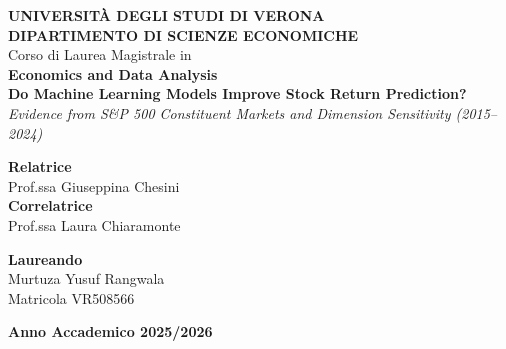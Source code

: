 \documentclass[12pt, a4paper]{report}
\begin{document}
\begin{titlepage}
\centering
\vspace*{0.5cm}

{\fontsize{14}{18}\selectfont\textbf{UNIVERSITÀ DEGLI STUDI DI VERONA}}\\[0.3cm]
{\fontsize{13}{16}\selectfont\textbf{DIPARTIMENTO DI SCIENZE ECONOMICHE}}\\[1.8cm]

{\fontsize{12}{15}\selectfont Corso di Laurea Magistrale in}\\[0.2cm]
{\fontsize{13}{16}\selectfont\textbf{Economics and Data Analysis}}\\[2.5cm]

{\fontsize{16}{20}\selectfont\textbf{Do Machine Learning Models Improve Stock Return Prediction?}}\\[0.4cm]
{\fontsize{12}{15}\selectfont\textit{Evidence from S\&P 500 Constituent Markets and Dimension Sensitivity (2015--2024)}}\\[3.0cm]

\begin{minipage}{0.48\textwidth}
\begin{flushleft}
{\fontsize{11}{14}\selectfont\textbf{Relatrice}}\\[0.1cm]
{\fontsize{12}{15}\selectfont Prof.ssa Giuseppina Chesini}\\[0.3cm]
{\fontsize{11}{14}\selectfont\textbf{Correlatrice}}\\[0.1cm]
{\fontsize{12}{15}\selectfont Prof.ssa Laura Chiaramonte}
\end{flushleft}
\end{minipage}
\hfill
\begin{minipage}{0.48\textwidth}
\begin{flushright}
{\fontsize{11}{14}\selectfont\textbf{Laureando}}\\[0.1cm]
{\fontsize{12}{15}\selectfont Murtuza Yusuf Rangwala}\\[0.1cm]
{\fontsize{11}{14}\selectfont Matricola VR508566}
\end{flushright}
\end{minipage}

\vfill
{\fontsize{11}{14}\selectfont\textbf{Anno Accademico 2025/2026}}
\end{titlepage}

\newpage
{}
\setcounter{page}{1}
\end{document}
